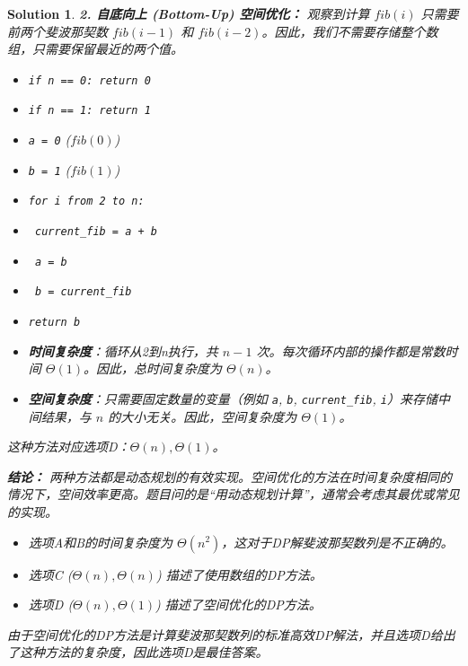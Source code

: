 \documentclass[UTF8]{report}
\newtheorem{solution}{Solution}
\theoremstyle{MyLineTheoremStyle} %
\theoremstyle{MyBlockTheoremStyle} %
\theoremstyle{MySubsubsectionStyle} %
\begin{document}
\begin{solution}
\textbf{2. 自底向上 (Bottom-Up) 空间优化：}
观察到计算 $fib(i)$ 只需要前两个斐波那契数 $fib(i-1)$ 和 $fib(i-2)$。因此，我们不需要存储整个数组，只需要保留最近的两个值。
\begin{itemize}
    \item \texttt{if n == 0: return 0}
    \item \texttt{if n == 1: return 1}
    \item \texttt{a = 0}  ($fib(0)$)
    \item \texttt{b = 1}  ($fib(1)$)
    \item \texttt{for i from 2 to n:}
    \item \texttt{    current\_fib = a + b}
    \item \texttt{    a = b}
    \item \texttt{    b = current\_fib}
    \item \texttt{return b}
\end{itemize}
\begin{itemize}
    \item \textbf{时间复杂度}：循环从2到n执行，共 $n-1$ 次。每次循环内部的操作都是常数时间 $\Theta(1)$。因此，总时间复杂度为 $\Theta(n)$。
        \item \textbf{空间复杂度}：只需要固定数量的变量（例如 \texttt{a}, \texttt{b}, \texttt{current\_fib}, \texttt{i}）来存储中间结果，与 $n$ 的大小无关。因此，空间复杂度为 $\Theta(1)$。
\end{itemize}
这种方法对应选项D：$\Theta(n), \Theta(1)$。

\textbf{结论：}
两种方法都是动态规划的有效实现。空间优化的方法在时间复杂度相同的情况下，空间效率更高。题目问的是“用动态规划计算”，通常会考虑其最优或常见的实现。
\begin{itemize}
    \item 选项A和B的时间复杂度为 $\Theta(n^2)$，这对于DP解斐波那契数列是不正确的。
    \item 选项C ($\Theta(n), \Theta(n)$) 描述了使用数组的DP方法。
    \item 选项D ($\Theta(n), \Theta(1)$) 描述了空间优化的DP方法。
\end{itemize}
由于空间优化的DP方法是计算斐波那契数列的标准高效DP解法，并且选项D给出了这种方法的复杂度，因此选项D是最佳答案。
\end{solution}
\end{document}
